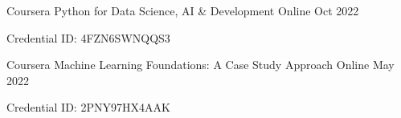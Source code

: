 

\begin{cventries}
  \cventry
    {Coursera} %
  {Python for Data Science, AI \& Development} %
    {Online}
    {Oct 2022} %
    {
      \begin{cvitems} %
        \item {Credential ID: 4FZN6SWNQQS3}
      \end{cvitems}
    }
  \cventry
    {Coursera} %
    {Machine Learning Foundations: A Case Study Approach} %
    {Online}
    {May 2022} %
    {
      \begin{cvitems} %
        \item {Credential ID: 2PNY97HX4AAK}
      \end{cvitems}
    }
\end{cventries}
